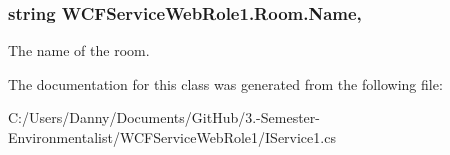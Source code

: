 \hypertarget{class_w_c_f_service_web_role1_1_1_room_ae1873490e3785fb100de49c6ac02edb5}{}
\subsubsection[{Name}]{\setlength{\rightskip}{0pt plus 5cm}string W\+C\+F\+Service\+Web\+Role1.\+Room.\+Name\hspace{0.3cm}{\ttfamily [get]}, {\ttfamily [set]}}\label{class_w_c_f_service_web_role1_1_1_room_ae1873490e3785fb100de49c6ac02edb5}


The name of the room. 



The documentation for this class was generated from the following file\+:\begin{DoxyCompactItemize}
\item 
C\+:/\+Users/\+Danny/\+Documents/\+Git\+Hub/3.-\/\+Semester-\/\+Environmentalist/\+W\+C\+F\+Service\+Web\+Role1/I\+Service1.\+cs\end{DoxyCompactItemize}
